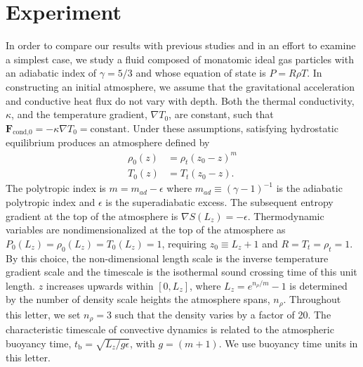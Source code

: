 \documentclass[aps, prl, twocolumn, nofootinbib, groupedaddress, amsfonts, amssymb, amsmath]{revtex4-1}
\newcommand{\grad}{\ensuremath{\nabla}}
\begin{document}
\section{Experiment} 
\label{sec:experiment}
In order to compare our results with previous studies and in an effort to examine a simplest case,
we study a fluid composed of monatomic ideal gas particles with an adiabatic index of $\gamma = 5/3$ and
whose equation of state is $P = R\rho T$. In constructing an initial atmosphere, we assume
that the gravitational
acceleration and conductive heat flux do not vary with depth. Both 
the thermal conductivity, $\kappa$, and the temperature gradient, $\grad T_0$, are constant,
such that $\bm{F}_{\text{cond,0}} = -\kappa \grad T_0 = \text{constant}$.
Under these assumptions, satisfying hydrostatic equilibrium produces an atmosphere defined by
\begin{equation}
\begin{split}
\rho_0(z) &= \rho_{t}(z_0 - z)^m \\
T_0(z)    &= T_{t}(z_0 - z).
\label{eqn:polytrope}
\end{split}
\end{equation}
The polytropic index is $m = m_{ad} - \epsilon$
where $m_{ad} \equiv (\gamma-1)^{-1}$ is the adiabatic polytropic index and $\epsilon$ is the
superadiabatic excess.
The subsequent entropy gradient at the top of the atmosphere is $\grad S(L_z) = -\epsilon$. 
Thermodynamic variables are nondimensionalized at the top of the atmosphere as 
$P_0(L_z) = \rho_0(L_z) = T_0(L_z) = 1$, requiring $z_0 \equiv L_z + 1$ and $R = T_{t} = \rho_{t} = 1$.
By this choice, the non-dimensional length scale is the inverse temperature gradient scale and
the timescale is the isothermal sound crossing time of this unit length.
$z$ increases upwards within $[0, L_{z}]$, where $L_{z} = e^{n_{\rho}/m} - 1$ is
determined by the number of density scale heights the atmosphere spans, $n_\rho$.
Throughout this letter, we set $n_{\rho} = 3$ such that the density varies by a factor of 20.
The characteristic timescale of convective dynamics
is related to the atmospheric buoyancy time, $t_{\text{b}} = \sqrt{L_z/g\epsilon}$, with $g = (m+1)$.
We use buoyancy time units in this letter.
\end{document}
